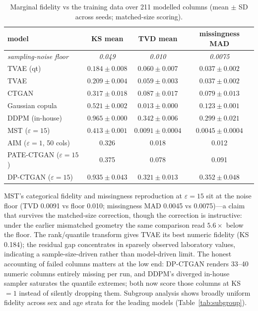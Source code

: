 \documentclass[11pt,a4paper]{article}
\newcommand{\eps}{\ensuremath{\varepsilon}}
\begin{document}
\begin{table}[htbp]
\centering
\caption{Marginal fidelity vs the training data over 211 modelled columns
(mean $\pm$ SD across seeds; matched-size scoring).}%
\label{tab:fidelity}
\begin{tabular}{lccc}
\toprule
model & KS mean & TVD mean & missingness MAD \\
\midrule
\emph{sampling-noise floor} & \emph{0.049} & \emph{0.010} & \emph{0.0075} \\
TVAE (qt) & $\mathbf{0.184 \pm 0.008}$ & $0.060 \pm 0.007$ & $0.037 \pm 0.002$ \\
TVAE & $0.209 \pm 0.004$ & $0.059 \pm 0.003$ & $0.037 \pm 0.002$ \\
CTGAN & $0.317 \pm 0.018$ & $0.087 \pm 0.017$ & $0.079 \pm 0.013$ \\
Gaussian copula & $0.521 \pm 0.002$ & $0.013 \pm 0.000$ & $0.123 \pm 0.001$ \\
DDPM (in-house) & $0.965 \pm 0.000$ & $0.342 \pm 0.006$ & $0.299 \pm 0.021$ \\
MST ($\eps{=}15$) & $0.413 \pm 0.001$ & $\mathbf{0.0091 \pm 0.0004}$ & $\mathbf{0.0045 \pm 0.0004}$ \\
AIM ($\eps{=}1$, 50 cols) & 0.326 & 0.018 & 0.012 \\
PATE-CTGAN ($\eps{=}15$) & 0.375 & 0.078 & 0.091 \\
DP-CTGAN ($\eps{=}15$) & $0.935 \pm 0.043$ & $0.321 \pm 0.013$ & $0.352 \pm 0.048$ \\
\bottomrule
\end{tabular}
\end{table}

MST's categorical fidelity and missingness reproduction at $\eps = 15$ sit at the
noise floor (TVD 0.0091 vs floor 0.010; missingness MAD 0.0045 vs 0.0075)---a
claim that survives the matched-size correction, though the correction is
instructive: under the earlier mismatched geometry the same comparison read
$5.6\times$ below the floor. The rank/quantile transform gives TVAE its best
numeric fidelity (KS 0.184); the residual gap concentrates in sparsely observed
laboratory values, indicating a sample-size-driven rather than model-driven limit.
The honest accounting of failed columns matters at the low end: DP-CTGAN renders
33--40 numeric columns entirely missing per run, and DDPM's diverged in-house
sampler saturates the quantile extremes; both now score those columns at KS $= 1$
instead of silently dropping them. Subgroup analysis shows broadly uniform
fidelity across sex and age strata for the leading models
(Table~\ref{tab:subgroup}).
\end{document}
